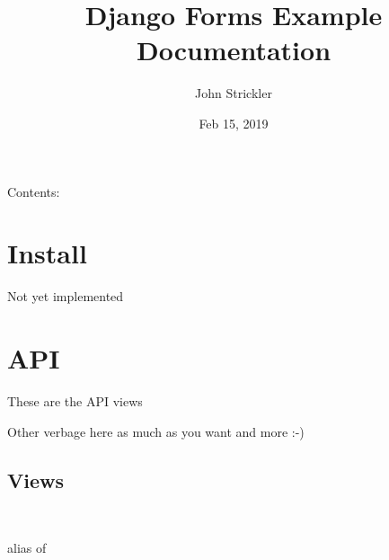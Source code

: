 \documentclass[letterpaper,10pt,english]{sphinxmanual}
\title{Django Forms Example Documentation}
\date{Feb 15, 2019}
\author{John Strickler}
\begin{document}
\pagestyle{empty}
\sphinxmaketitle
\pagestyle{plain}
\sphinxtableofcontents
\pagestyle{normal}
\label{\detokenize{index::doc}}


Contents:


\chapter{Install}
\label{\detokenize{install:install}}\label{\detokenize{install::doc}}
Not yet implemented


\chapter{API}
\label{\detokenize{api:api}}\label{\detokenize{api::doc}}
These are the API views

Other verbage here as much as you want and more :-)


\section{Views}
\label{\detokenize{api:module-apiv1.views}}\label{\detokenize{api:views}}

\begin{fulllineitems}
\label{\detokenize{api:apiv1.views.EnemyDetail}}~

\begin{fulllineitems}
\label{\detokenize{api:apiv1.views.EnemyDetail.serializer_class}}
alias of {\hyperref[\detokenize{api:apiv1.serializers.EnemySerializer}]{}}

\end{fulllineitems}


\end{fulllineitems}

\end{document}

